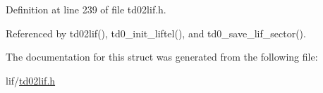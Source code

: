 Definition at line 239 of file td02lif.\+h.



Referenced by td02lif(), td0\+\_\+init\+\_\+liftel(), and td0\+\_\+save\+\_\+lif\+\_\+sector().



The documentation for this struct was generated from the following file\+:\begin{DoxyCompactItemize}
\item 
lif/\hyperlink{td02lif_8h}{td02lif.\+h}\end{DoxyCompactItemize}
